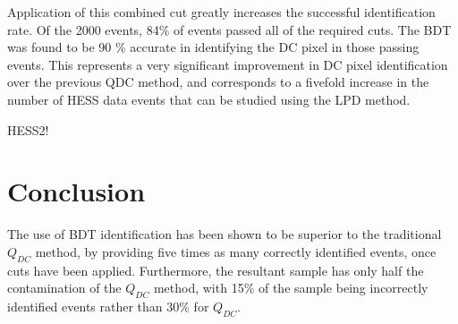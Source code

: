 \documentclass[]{article}
\begin{document}
Application of this combined cut greatly increases the successful identification rate. Of the 2000 events, 84\% of events passed all of the required cuts. The BDT was found to be 90 \% accurate in identifying the DC pixel in those passing events. This represents a very significant improvement in DC pixel identification over the previous QDC method, and corresponds to a fivefold increase in the number of HESS data events that can be studied using the LPD method.

HESS2!

\section{Conclusion}
The use of BDT identification has been shown to be superior to the traditional $Q_{DC}$ method, by providing five times as many correctly identified events, once cuts have been applied. Furthermore, the resultant sample has only half the contamination of the $Q_{DC}$ method, with 15\% of the sample being incorrectly identified events rather than 30\% for $Q_{DC}$.



\end{document}
